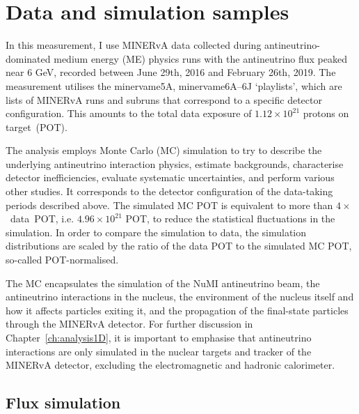 \chapter{Data and simulation samples}

\label{ch:dataAsimulation}
\vspace{-20pt}
In this measurement, I use MINERvA data collected during antineutrino-dominated medium energy (ME) physics runs with the antineutrino flux peaked near $6$ GeV, recorded between June 29th, 2016 and February 26th, 2019. The measurement utilises the minervame5A, \mbox{minervame6A--6J} `playlists', which are lists of MINERvA runs and subruns that correspond to a specific detector configuration. This amounts to the total data exposure of $1.12 \times 10^{21}$ protons on \mbox{target (POT).} 

The analysis employs Monte Carlo (MC) simulation to try to describe the underlying antineutrino interaction physics, estimate backgrounds, characterise detector inefficiencies, evaluate systematic uncertainties, and perform various other studies. It corresponds to the detector configuration of the data-taking periods described above. The simulated MC POT is equivalent to more than \mbox{$4 \times$ data POT}, i.e. $4.96 \times 10^{21}$ POT, to reduce the statistical fluctuations in the simulation. In order to compare the simulation to data, the simulation distributions are scaled by the ratio of the data POT to the simulated MC POT, so-called POT-normalised. 

The MC encapsulates the simulation of the NuMI antineutrino beam, the antineutrino interactions in the nucleus, the environment of the nucleus itself and how it affects particles exiting it, and the propagation of the final-state particles through the MINERvA detector. For further discussion in Chapter~\ref{ch:analysis1D}, it is important to emphasise that antineutrino interactions are only simulated in the nuclear targets and tracker of the MINERvA detector, excluding the electromagnetic and hadronic calorimeter.

\section{Flux simulation} \label{sec:fluxSimulation}

